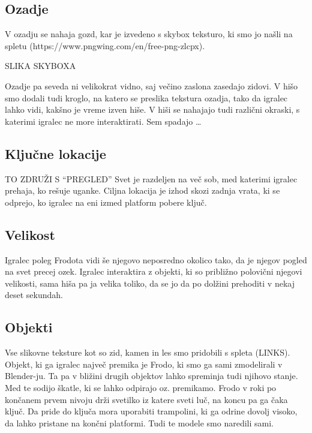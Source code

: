 \documentclass[a4paper,12pt]{article}
\begin{document}
\subsection{Ozadje}
\noindent  V ozadju se nahaja gozd, kar je izvedeno s skybox teksturo, ki smo jo našli na spletu (https://www.pngwing.com/en/free-png-zlcpx).

SLIKA SKYBOXA

Ozadje pa seveda ni velikokrat vidno, saj večino zaslona zasedajo zidovi. V hišo smo dodali tudi kroglo, na katero se preslika tekstura ozadja, tako da igralec lahko vidi, kakšno je vreme izven hiše. V hiši se nahajajo tudi različni okraski, s katerimi igralec ne more interaktirati. Sem spadajo …

\begin{figure}[h!]
    \centering
\end{figure}

\subsection{Ključne lokacije}
TO ZDRUŽI S “PREGLED”
\noindent Svet je razdeljen na več sob, med katerimi igralec prehaja, ko rešuje uganke. Ciljna lokacija je izhod skozi zadnja vrata, ki se odprejo, ko igralec na eni izmed platform pobere ključ.


\subsection{Velikost}
\noindent Igralec poleg Frodota vidi še njegovo neposredno okolico tako, da je njegov pogled na svet precej ozek. Igralec interaktira z objekti, ki so približno polovični njegovi velikosti, sama hiša pa ja velika toliko, da se jo da po dolžini prehoditi v nekaj deset sekundah.

\subsection{Objekti}
\noindent Vse slikovne teksture kot so zid, kamen in les smo pridobili s spleta (LINKS). Objekt, ki ga igralec največ premika je Frodo, ki smo ga sami zmodelirali v Blender-ju. Ta pa v bližini drugih objektov lahko spreminja tudi njihovo stanje. Med te sodijo škatle, ki se lahko odpirajo oz. premikamo. Frodo v roki po končanem prvem nivoju drži svetilko iz katere sveti luč, na koncu pa ga čaka ključ. Da pride do ključa mora uporabiti trampolini, ki ga odrine dovolj visoko, da lahko pristane na končni platformi. Tudi te modele smo naredili sami.
\end{document}
